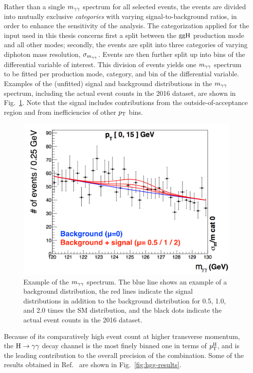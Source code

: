 Rather than a single $m_{\mathrm{\gamma}\mathrm{\gamma}}$ spectrum for all selected events, the events are divided into mutually exclusive \textit{categories} with varying signal-to-background ratios, in order to enhance the sensitivity of the analysis.
% 
The categorization applied for the input used in this thesis concerns first a split between the $\mathrm{g}\mathrm{g}\mathrm{H}$ production mode and all other modes; secondly, the events are split into three categories of varying diphoton mass resolution, $\sigma_{m_{\mathrm{\gamma}\mathrm{\gamma}}}$.
% 
Events are then further split up into bins of the differential variable of interest.
% 
This division of events yields one $m_{\mathrm{\gamma}\mathrm{\gamma}}$ spectrum to be fitted per production mode, category, and bin of the differential variable.
% 
Examples of the (unfitted) signal and background distributions in the $m_{\mathrm{\gamma}\mathrm{\gamma}}$ spectrum, including the actual event counts in the 2016 dataset, are shown in Fig.~\ref{fig:example_mgg}.
% 
Note that the signal includes contributions from the outside-of-acceptance region and from inefficiencies of other $p_\mathrm{T}$ bins.

\begin{figure}[hbtp]
  \begin{center}
    \includegraphics[width=0.7\linewidth]{img/inputs/hgg/example_mgg.png}
    \caption{
        Example of the $m_{\mathrm{\gamma}\mathrm{\gamma}}$ spectrum.
        The blue line shows an example of a background distribution, the red lines indicate the signal distributions in addition to the background distribution for 0.5, 1.0, and 2.0 times the SM distribution, and the black dots indicate the actual event counts in the 2016 dataset.
        }
    \label{fig:example_mgg}
  \end{center}
\end{figure}


Because of its comparatively high event count at higher transverse momentum, the $\mathrm{H}\to\mathrm{\gamma}\mathrm{\gamma}$ decay channel is the most finely binned one in terms of $p_\mathrm{T}^\mathrm{H}$, and is the leading contribution to the overall precision of the combination.
% 
Some of the results obtained in Ref.~\cite{Sirunyan:2018kta} are shown in Fig.~\ref{fig:hgg-results}.


